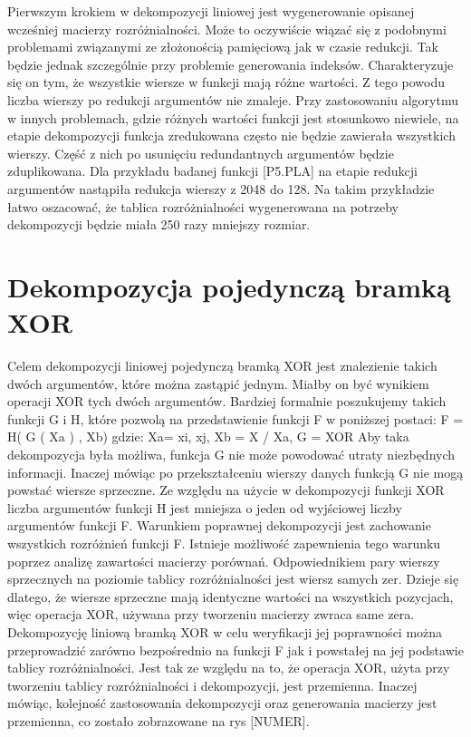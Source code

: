 Pierwszym krokiem w dekompozycji liniowej jest wygenerowanie opisanej wcześniej macierzy rozróżnialności.
Może to oczywiście wiązać się z podobnymi problemami związanymi ze złożonością pamięciową jak w czasie redukcji.
Tak będzie jednak szczególnie przy problemie generowania indeksów.
Charakteryzuje się on tym, że wszystkie wiersze w funkcji mają różne wartości.
Z tego powodu liczba wierszy po redukcji argumentów nie zmaleje.
Przy zastosowaniu algorytmu w innych problemach, gdzie różnych wartości funkcji jest stosunkowo niewiele, na etapie dekompozycji funkcja zredukowana często nie będzie zawierała wszystkich wierszy.
Część z nich po usunięciu redundantnych argumentów będzie zduplikowana.
Dla przykładu badanej funkcji [P5.PLA] na etapie redukcji argumentów nastąpiła redukcja wierszy z 2048 do 128.
Na takim przykładzie łatwo oszacować, że tablica rozróżnialności wygenerowana na potrzeby dekompozycji będzie miała 250 razy mniejszy rozmiar.

\section{Dekompozycja pojedynczą bramką XOR}

Celem dekompozycji liniowej pojedynczą bramką XOR jest znalezienie takich dwóch argumentów, które można zastąpić jednym.
Miałby on być wynikiem operacji XOR tych dwóch argumentów.
Bardziej formalnie poszukujemy takich funkcji G i H, które pozwolą na przedstawienie funkcji F w poniższej postaci:
F = H( G ( Xa ) , Xb)
gdzie: Xa= {xi, xj}, Xb = X / Xa, G = XOR
Aby taka dekompozycja była możliwa, funkcja G nie może powodować utraty niezbędnych informacji.
Inaczej mówiąc po przekształceniu wierszy danych funkcją G nie mogą powstać wiersze sprzeczne.
Ze względu na użycie w dekompozycji funkcji XOR liczba argumentów funkcji H jest mniejsza o jeden od wyjściowej liczby argumentów funkcji F.
	Warunkiem poprawnej dekompozycji jest zachowanie wszystkich rozróżnień funkcji F.
Istnieje możliwość zapewnienia tego warunku poprzez analizę zawartości macierzy porównań.
Odpowiednikiem pary wierszy sprzecznych na poziomie tablicy rozróżnialności jest wiersz samych zer.
Dzieje się dlatego, że wiersze sprzeczne mają identyczne wartości na wszystkich pozycjach, więc operacja XOR, używana przy tworzeniu macierzy zwraca same zera.
	Dekompozycję liniową bramką XOR w celu weryfikacji jej poprawności można przeprowadzić zarówno bezpośrednio na funkcji F jak i powstałej na jej podstawie tablicy rozróżnialności.
Jest tak ze względu na to, że operacja XOR, użyta przy tworzeniu tablicy rozróżnialności i dekompozycji, jest przemienna.
Inaczej mówiąc, kolejność zastosowania dekompozycji oraz generowania macierzy jest przemienna, co zostało zobrazowane na rys [NUMER].



